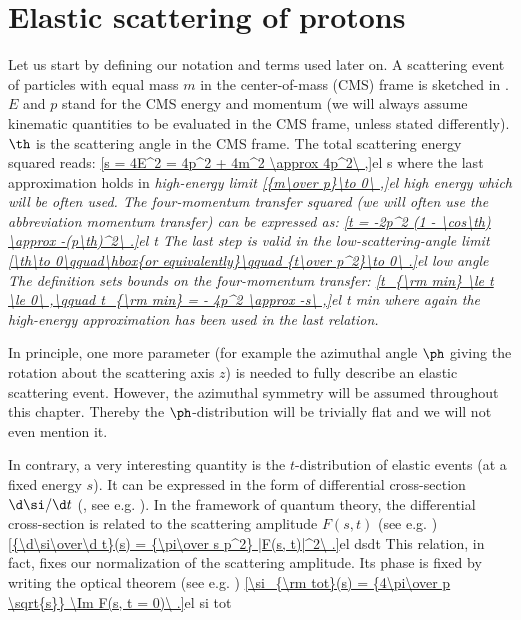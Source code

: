 \def\FC{F^{\rm C}}
\def\FH{F^{\rm H}}
\def\FCH{F^{\rm C+H}}

\def\KL{Kundr\' at-Lokaj\' i\v cek}
\def\KaL{Kundr\' at and Lokaj\' i\v cek}
\def\WY{West-Yennie}
\def\WaY{West and Yennie}


\iffalse
CMS, QCD, QFT, LHC, BFKL, HP, LxG, RMS, QED, QM, OPE, TPE, IR, KL, CKL, WY, SWY
ATLAS ALFA, TDR
\fi

\chapter[el]{Elastic scattering of protons}



Let us start by defining our notation and terms used later on. A scattering event of particles with equal mass $m$ in the center-of-mass (CMS) frame is sketched in . $E$ and $p$ stand for the CMS energy and momentum (we will always assume kinematic quantities to be evaluated in the CMS frame, unless stated differently). $\th$ is the scattering angle in the CMS frame. The total scattering energy squared reads:
\eqref{s = 4E^2 = 4p^2 + 4m^2 \approx 4p^2\ ,}{el s}
where the last approximation holds in \em{high-energy} limit
\eqref{{m\over p}\to 0\ ,}{el high energy}
which will be often used. The four-momentum transfer squared (we will often use the abbreviation momentum transfer) can be expressed as:
\eqref{t = -2p^2 (1 - \cos\th) \approx -(p\th)^2\ .}{el t}
The last step is valid in the \em{low-scattering-angle} limit
\eqref{\th\to 0\qquad\hbox{or equivalently}\qquad {t\over p^2}\to 0\ .}{el low angle}
The definition  sets bounds on the four-momentum transfer:
\eqref{t_{\rm min} \le t \le 0\ ,\qquad t_{\rm min} = - 4p^2 \approx -s\ ,}{el t min}
where again the high-energy approximation has been used in the last relation.

In principle, one more parameter (for example the azimuthal angle $\ph$ giving the rotation about the scattering axis $z$) is needed to fully describe an elastic scattering event. However, the azimuthal symmetry will be assumed throughout this chapter. Thereby the $\ph$-distribution will be trivially flat and we will not even mention it.

In contrary, a very interesting quantity is the $t$-distribution of elastic events (at a fixed energy $s$). It can be expressed in the form of differential cross-section $\d\si/\d t$ (, see e.g. ). In the framework of quantum theory, the differential cross-section is related to the scattering amplitude $F(s, t)$ (see e.g. )
\eqref{{\d\si\over\d t}(s) = {\pi\over s p^2} |F(s, t)|^2\ .}{el dsdt}
This relation, in fact, fixes our normalization of the scattering amplitude. Its phase is fixed by writing the optical theorem (see e.g. )
\eqref{\si_{\rm tot}(s) = {4\pi\over p \sqrt{s}} \Im F(s, t = 0)\ .}{el si tot}

